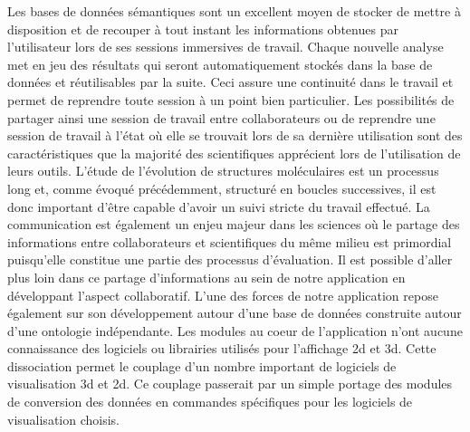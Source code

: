 Les bases de données sémantiques sont un excellent moyen de stocker de mettre à disposition et de recouper à tout instant les informations obtenues par l'utilisateur lors de ses sessions immersives de travail. Chaque nouvelle analyse met en jeu des résultats qui seront automatiquement stockés dans la base de données et réutilisables par la suite. Ceci assure une continuité dans le travail et permet de reprendre toute session à un point bien particulier. Les possibilités de partager ainsi une session de travail entre collaborateurs ou de reprendre une session de travail à l'état où elle se trouvait lors de sa dernière utilisation sont des caractéristiques que la majorité des scientifiques apprécient lors de l'utilisation de leurs outils. L'étude de l'évolution de structures moléculaires est un processus long et, comme évoqué précédemment, structuré en boucles successives, il est donc important d'être capable d'avoir un suivi stricte du travail effectué. La communication est également un enjeu majeur dans les sciences où le partage des informations entre collaborateurs et scientifiques du même milieu est primordial puisqu'elle constitue une partie des processus d'évaluation. Il est possible d'aller plus loin dans ce partage d'informations au sein de notre application en développant l'aspect collaboratif. L'une des forces de notre application repose également sur son développement autour d'une base de données construite autour d'une ontologie indépendante. Les modules au coeur de l'application n'ont aucune connaissance des logiciels ou librairies utilisés pour l'affichage 2d et 3d. Cette dissociation permet le couplage d'un nombre important de logiciels de visualisation 3d et 2d. Ce couplage passerait par un simple portage des modules de conversion des données en commandes spécifiques pour les logiciels de visualisation choisis.